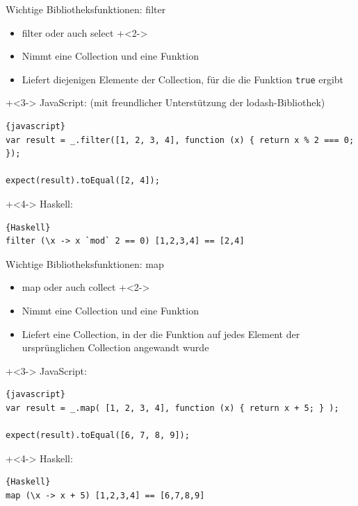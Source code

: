 \begin{frame}[fragile]{Wichtige Bibliotheksfunktionen: filter}
\begin{itemize}
\item filter oder auch select
\onslide+<2->
\item Nimmt eine Collection und eine Funktion
\item Liefert diejenigen Elemente der Collection, für die die Funktion \texttt{true} ergibt
\end{itemize}

\onslide+<3->
JavaScript: (mit freundlicher Unterstützung der lodash-Bibliothek)
\begin{lstlisting}{javascript}
var result = _.filter([1, 2, 3, 4], function (x) { return x % 2 === 0; });
    
expect(result).toEqual([2, 4]);
\end{lstlisting}
\onslide+<4->
Haskell:
\begin{lstlisting}{Haskell}
filter (\x -> x `mod` 2 == 0) [1,2,3,4] == [2,4]
\end{lstlisting}

\end{frame}


\begin{frame}[fragile]{Wichtige Bibliotheksfunktionen: map}
\begin{itemize}
\item map oder auch collect
\onslide+<2->
\item Nimmt eine Collection und eine Funktion
\item Liefert eine Collection, in der die Funktion auf jedes Element der ursprünglichen Collection angewandt wurde
\end{itemize}

\onslide+<3->
JavaScript:
\begin{lstlisting}{javascript}
var result = _.map( [1, 2, 3, 4], function (x) { return x + 5; } );

expect(result).toEqual([6, 7, 8, 9]);
\end{lstlisting}
\onslide+<4->
Haskell:
\begin{lstlisting}{Haskell}
map (\x -> x + 5) [1,2,3,4] == [6,7,8,9]
\end{lstlisting}

\end{frame}

